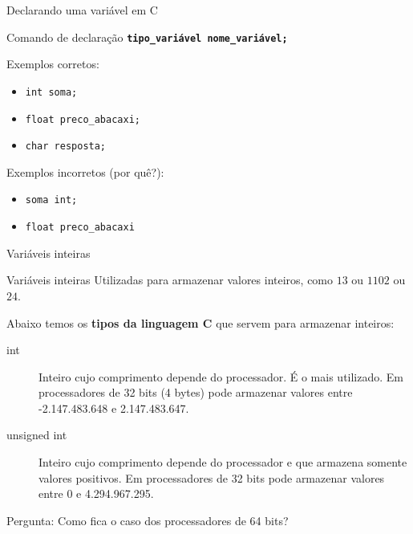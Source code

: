 \documentclass[handout]{beamer}
\begin{document}
\begin{frame}{Declarando uma variável em C}

    \begin{block}{Comando de declaração}
        \texttt{\textbf{tipo\_variável nome\_variável;}}
    \end{block}

    \pause
    Exemplos corretos:
    \begin{itemize}
        \item \texttt{int soma;}
        \item \texttt{float preco\_abacaxi;}
        \item \texttt{char resposta;}
    \end{itemize}

    \pause
    Exemplos incorretos (por quê?):
    \begin{itemize}
        \item \texttt{soma int;}
        \item \texttt{float preco\_abacaxi}
    \end{itemize}
\end{frame}

\begin{frame}{Variáveis inteiras}

    \begin{block}{Variáveis inteiras}
        Utilizadas para armazenar valores inteiros, como $13$ ou $1102$ ou $24$.
    \end{block}

    \pause
    Abaixo temos os {\bf tipos da linguagem C} que servem para armazenar inteiros:
    \begin{description}
        \item[int] Inteiro cujo comprimento depende do processador.
        É o mais utilizado.
        Em processadores de 32 bits (4 bytes) pode armazenar valores entre -2.147.483.648 e 2.147.483.647.

        \pause
        \item[unsigned int] Inteiro cujo comprimento depende do processador e que armazena somente valores positivos.
        Em processadores de 32 bits pode armazenar valores entre 0 e 4.294.967.295.
    \end{description}

    \pause
    \alert{Pergunta:} Como fica o caso dos processadores de 64 bits?
\end{frame}
\end{document}
